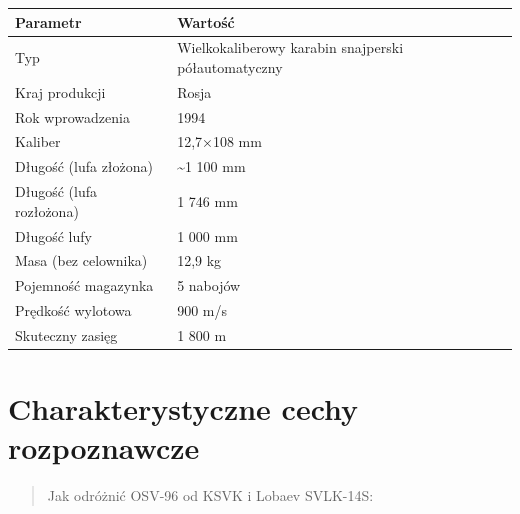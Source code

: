 \documentclass[12pt,openany,oneside]{book}
\begin{document}
\begin{longtable}[]{@{}ll@{}}
\toprule\noalign{}
Parametr & Wartość \\
\midrule\noalign{}
\endhead
\bottomrule\noalign{}
\endlastfoot
Typ & Wielkokaliberowy karabin snajperski półautomatyczny \\
Kraj produkcji & Rosja \\
Rok wprowadzenia & 1994 \\
Kaliber & 12,7×108 mm \\
Długość (lufa złożona) & \textasciitilde1 100 mm \\
Długość (lufa rozłożona) & 1 746 mm \\
Długość lufy & 1 000 mm \\
Masa (bez celownika) & 12,9 kg \\
Pojemność magazynka & 5 nabojów \\
Prędkość wylotowa & 900 m/s \\
Skuteczny zasięg & 1 800 m \\
\end{longtable}

\section{Charakterystyczne cechy
rozpoznawcze}\label{charakterystyczne-cechy-rozpoznawcze-66}

\begin{quote}
Jak odróżnić OSV-96 od KSVK i Lobaev SVLK-14S:
\end{quote}
\end{document}
